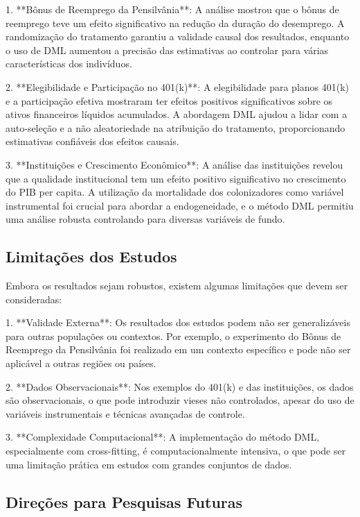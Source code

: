 \documentclass[a4paper,12pt]{article}[abntex2]
\begin{document}
1. **Bônus de Reemprego da Pensilvânia**: A análise mostrou que o bônus de reemprego teve um efeito significativo na redução da duração do desemprego. A randomização do tratamento garantiu a validade causal dos resultados, enquanto o uso de DML aumentou a precisão das estimativas ao controlar para várias características dos indivíduos.

2. **Elegibilidade e Participação no 401(k)**: A elegibilidade para planos 401(k) e a participação efetiva mostraram ter efeitos positivos significativos sobre os ativos financeiros líquidos acumulados. A abordagem DML ajudou a lidar com a auto-seleção e a não aleatoriedade na atribuição do tratamento, proporcionando estimativas confiáveis dos efeitos causais.

3. **Instituições e Crescimento Econômico**: A análise das instituições revelou que a qualidade institucional tem um efeito positivo significativo no crescimento do PIB per capita. A utilização da mortalidade dos colonizadores como variável instrumental foi crucial para abordar a endogeneidade, e o método DML permitiu uma análise robusta controlando para diversas variáveis de fundo.

\subsection*{Limitações dos Estudos}

Embora os resultados sejam robustos, existem algumas limitações que devem ser consideradas:

1. **Validade Externa**: Os resultados dos estudos podem não ser generalizáveis para outras populações ou contextos. Por exemplo, o experimento do Bônus de Reemprego da Pensilvânia foi realizado em um contexto específico e pode não ser aplicável a outras regiões ou países.

2. **Dados Observacionais**: Nos exemplos do 401(k) e das instituições, os dados são observacionais, o que pode introduzir vieses não controlados, apesar do uso de variáveis instrumentais e técnicas avançadas de controle.

3. **Complexidade Computacional**: A implementação do método DML, especialmente com cross-fitting, é computacionalmente intensiva, o que pode ser uma limitação prática em estudos com grandes conjuntos de dados.

\subsection*{Direções para Pesquisas Futuras}
\end{document}
